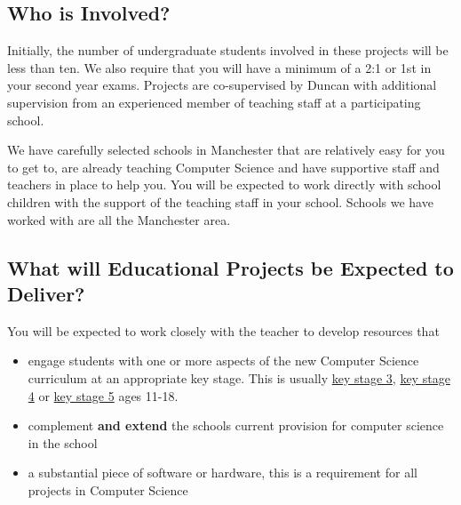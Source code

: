 \documentclass[
  12pt,
]{book}
\providecommand{\tightlist}{%
  \setlength{\itemsep}{0pt}\setlength{\parskip}{0pt}}
\begin{document}
\hypertarget{who-is-involved}{%
\subsection{Who is Involved?}\label{who-is-involved}}

Initially, the number of undergraduate students involved in these projects will be less than ten. We also require that you will have a minimum of a 2:1 or 1st in your second year exams. Projects are co-supervised by Duncan with additional supervision from an experienced member of teaching staff at a participating school.

We have carefully selected schools in Manchester that are relatively easy for you to get to, are already teaching Computer Science and have supportive staff and teachers in place to help you. You will be expected to work directly with school children with the support of the teaching staff in your school. Schools we have worked with are all the Manchester area.

\hypertarget{what-will-educational-projects-be-expected-to-deliver}{%
\subsection{What will Educational Projects be Expected to Deliver?}\label{what-will-educational-projects-be-expected-to-deliver}}

You will be expected to work closely with the teacher to develop resources that

\begin{itemize}
\tightlist
\item
  engage students with one or more aspects of the new Computer Science curriculum at an appropriate key stage. This is usually \href{https://en.wikipedia.org/wiki/Key_Stage_3}{key stage 3}, \href{https://en.wikipedia.org/wiki/Key_Stage_4}{key stage 4} or \href{https://en.wikipedia.org/wiki/Key_Stage_5}{key stage 5} ages 11-18.
\item
  complement \textbf{and extend} the schools current provision for computer science in the school
\item
  a substantial piece of software or hardware, this is a requirement for all projects in Computer Science
\end{itemize}
\end{document}
